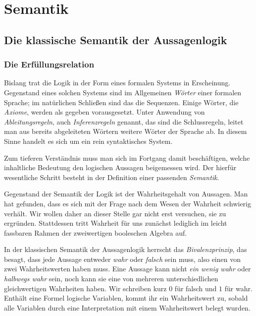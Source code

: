 
\chapter{Semantik}

\section{Die klassische Semantik der Aussagenlogik}

\subsection{Die Erfüllungsrelation}

Bislang trat die Logik in der Form eines formalen Systems in
Erscheinung. Gegenstand eines solchen Systems sind im Allgemeinen
\emph{Wörter} einer formalen Sprache; im natürlichen Schließen sind das
die Sequenzen. Einige Wörter, die \emph{Axiome}, werden als gegeben
vorausgesetzt. Unter Anwendung von \emph{Ableitungsregeln}, auch
\emph{Inferenzregeln} genannt, das sind die Schlussregeln, leitet man
aus bereits abgeleiteten Wörtern weitere Wörter der Sprache ab.
In diesem Sinne handelt es sich um ein rein syntaktisches System.

Zum tieferen Verständnis muss man sich im Fortgang damit beschäftigen,
welche inhaltliche Bedeutung den logischen Aussagen beigemessen
wird. Der hierfür wesentliche Schritt besteht in der Definition
einer passenden \emph{Semantik}.

Gegenstand der Semantik der Logik ist der Wahrheitsgehalt von Aussagen.
Man hat gefunden, dass es sich mit der Frage nach dem Wesen der Wahrheit
schwierig verhält. Wir wollen daher an dieser Stelle gar nicht erst
versuchen, sie zu ergründen. Stattdessen tritt Wahrheit für uns zunächst
lediglich im leicht fassbaren Rahmen der zweiwertigen booleschen
Algebra auf.

In der klassischen Semantik der Aussagenlogik herrscht das
\emph{Bivalenzprinzip}, das besagt, dass jede
Aussage entweder \emph{wahr} oder \emph{falsch} sein muss, also einen
von zwei Wahrheitswerten haben muss. Eine Aussage
kann nicht \emph{ein wenig wahr} oder \emph{halbwegs wahr} sein, noch
kann sie eine von mehreren unterschiedlichen gleichwertigen Wahrheiten
haben. Wir schreiben kurz $0$ für falsch und $1$ für wahr. Enthält eine
Formel logische Variablen, kommt ihr ein Wahrheitswert zu, sobald alle
Variablen durch eine Interpretation mit
einem Wahrheitswert belegt wurden.

